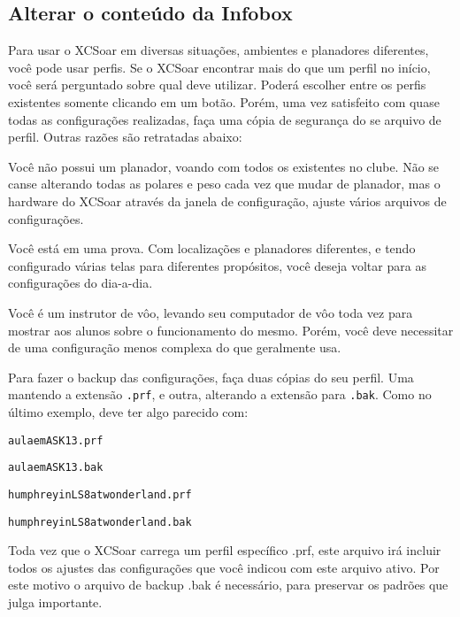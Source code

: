 \documentclass[a4paper,12pt,utf8]{scrreprt}
\begin{document}
\subsection{\textcolor{flashblue}{Alterar o conteúdo da Infobox}}
Para usar o XCSoar em diversas situações, ambientes e planadores diferentes, você pode usar perfis.  Se o XCSoar encontrar mais do que um perfil no início, você será perguntado sobre qual deve utilizar.  Poderá escolher entre os perfis existentes somente clicando em um botão.  Porém, uma vez satisfeito com quase todas as configurações realizadas, faça uma cópia de segurança do se arquivo de perfil.  Outras razões são retratadas abaixo:
\begin{compactitem}
\item Você não possui um planador, voando com todos os existentes no clube.  Não se canse alterando todas as polares e peso cada vez que mudar de planador, mas o hardware do XCSoar através da janela de configuração, ajuste vários arquivos de configurações.
\item Você está em uma prova.  Com localizações e planadores diferentes, e tendo configurado várias telas para diferentes propósitos, você deseja voltar para as configurações do dia-a-dia.
\item Você é um instrutor de vôo, levando seu computador de vôo toda vez para mostrar aos alunos sobre o funcionamento do mesmo.  Porém, você deve necessitar de uma configuração menos complexa do que geralmente usa.
\end{compactitem}
Para fazer o backup das configurações, faça duas cópias do seu perfil.  Uma mantendo a extensão \verb+.prf+, e outra, alterando a extensão para \verb+.bak+. Como no último exemplo, deve ter algo parecido com:
\begin{compactitem}
\item\verb+aulaemASK13.prf+
\item\verb+aulaemASK13.bak+
\item\verb+humphreyinLS8atwonderland.prf+
\item\verb+humphreyinLS8atwonderland.bak+
\end{compactitem}
Toda vez que o XCSoar carrega um perfil específico .prf, este arquivo irá incluir todos os ajustes das configurações que você indicou com este arquivo ativo.  Por este motivo o arquivo de backup .bak é necessário, para preservar os padrões que julga importante.
\end{document}
